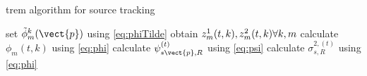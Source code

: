 \begin{algorithm}[H]
\caption{\acrshort{trem} algorithm for source tracking}
\label{alg:trem}
\begin{algorithmic}
\State set $\tilde\phi^k_m(\vect{p})$ using \ref{eq:phiTilde}
\State obtain $z_m^1(t,k), z_m^2(t,k)\space\forall k,m$
\State calculate $\phi_m(t,k)$ using \ref{eq:phi}
\State calculate $\psi^{(t)}_{s\vect{p},R}$ using \ref{eq:psi}
\State calculate $\sigma^{2,(t)}_{s,R}$ using \ref{eq:phi}
\EndFor
\end{algorithmic}
\end{algorithm}